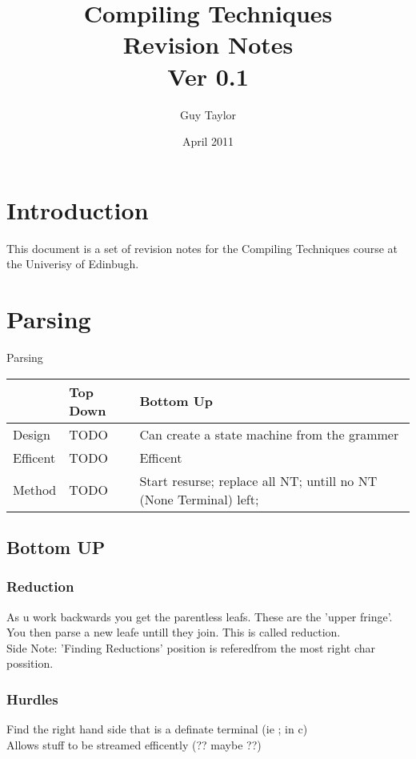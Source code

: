 \documentclass[11pt,twoside,a4paper]{article}
\begin{document}
  
  \title{Compiling Techniques \\Revision Notes \\ Ver 0.1}
  \author{Guy Taylor}
  \date{April 2011}
  
  \maketitle
  
  \tableofcontents
  
  \section{Introduction}
    This document is a set of revision notes for the Compiling Techniques\textsuperscript{\cite{ct_home}} course at the Univerisy of Edinbugh.
  
  \clearpage
  \section{Parsing}
    Parsing
    
    \begin{center}\begin{tabular}{l|l|l}
       & Top Down & Bottom Up \\ \hline
      Design & TODO & Can create a state machine from the grammer \\
      Efficent & TODO & Efficent \\
      Method & TODO & Start resurse; replace all NT; untill no NT (None Terminal) left; \\
    \end{tabular}\end{center}
    
    \subsection{Bottom UP}
      \subsubsection{Reduction}
      As u work backwards you get the parentless leafs. These are the 'upper fringe'. You then parse a new leafe untill they join. This is called reduction. \\
      Side Note: 'Finding Reductions' position is referedfrom the most right char possition.
      
      \subsubsection{Hurdles}
        Find the right hand side that is a definate terminal (ie ; in c) \\
        Allows stuff to be streamed efficently (?? maybe ??)
      
\end{document}
